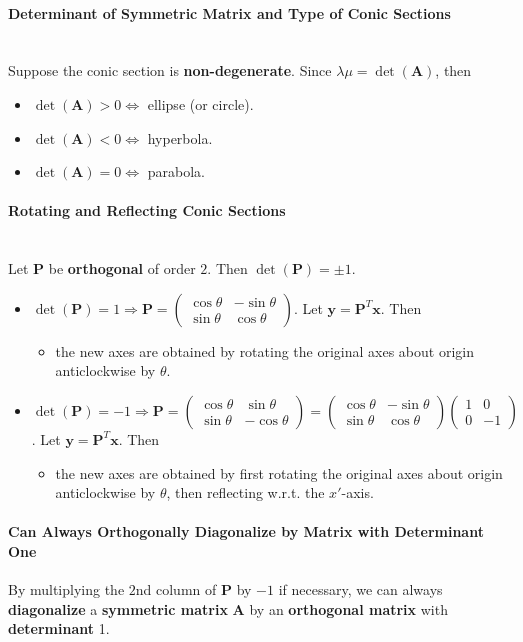\documentclass[../ma2001_notes.tex]{subfiles}
\begin{document}
\paragraph{Determinant of Symmetric Matrix and Type of Conic Sections}\,\\
Suppose the conic section is \textbf{non-degenerate}. Since \(\lambda\mu=\det(\bm{A})\), then
\begin{itemize}
	\item\(\det(\bm{A})>0\Leftrightarrow\) ellipse (or circle).
	\item\(\det(\bm{A})<0\Leftrightarrow\) hyperbola.
	\item\(\det(\bm{A})=0\Leftrightarrow\) parabola.
\end{itemize}

\paragraph{Rotating and Reflecting Conic Sections}\,\\
Let \(\bm{P}\) be \textbf{orthogonal} of order \(2\). Then \(\det(\bm{P})=\pm1\).
\begin{itemize}
	\item\(\det(\bm{P})=1\Rightarrow\bm{P}=\begin{pmatrix}
		\cos\theta & -\sin\theta \\ \sin\theta & \cos\theta
	\end{pmatrix}\). Let \(\bm{y}=\bm{P}^T\bm{x}\). Then
	\begin{itemize}
		\item the new axes are obtained by rotating the original axes about origin anticlockwise by \(\theta\).
	\end{itemize}
	\item\(\det(\bm{P})=-1\Rightarrow\bm{P}=\begin{pmatrix}
		\cos\theta & \sin\theta \\ \sin\theta & -\cos\theta
	\end{pmatrix}=\begin{pmatrix}
		\cos\theta & -\sin\theta \\ \sin\theta & \cos\theta
	\end{pmatrix}\begin{pmatrix}
		1 & 0 \\ 0 & -1
	\end{pmatrix}\). Let \(\bm{y}=\bm{P}^T\bm{x}\). Then
	\begin{itemize}
		\item the new axes are obtained by first rotating the original axes about origin anticlockwise by \(\theta\), then reflecting w.r.t. the \(x'\)-axis.
	\end{itemize}
\end{itemize}

\paragraph{Can Always Orthogonally Diagonalize by Matrix with Determinant One}
By multiplying the \(2\)nd column of \(\bm{P}\) by \(-1\) if necessary, we can always \textbf{diagonalize} a \textbf{symmetric matrix} \(\bm{A}\) by an \textbf{orthogonal matrix} with \textbf{determinant} 1.
\end{document}
